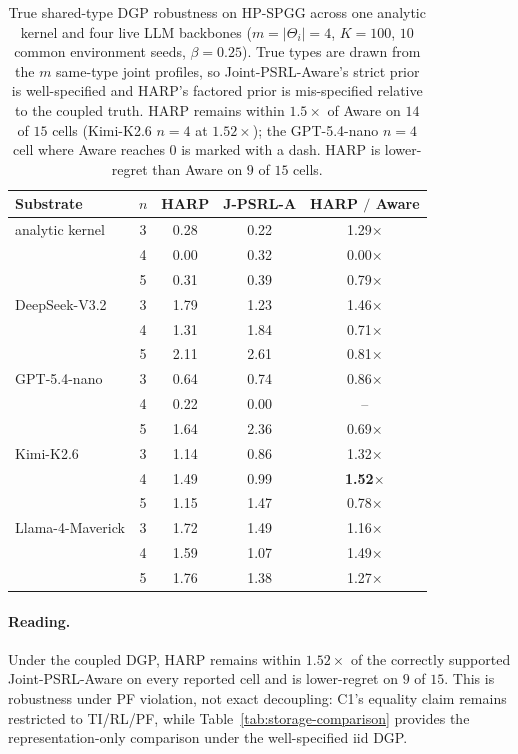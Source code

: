 \begin{table}[h]
\centering\small
\caption{True shared-type DGP robustness on HP-SPGG across one analytic kernel and four live LLM backbones ($m{=}|\Theta_i|{=}4$, $K{=}100$, $10$ common environment seeds, $\beta{=}0.25$). True types are drawn from the $m$ same-type joint profiles, so Joint-PSRL-Aware's strict prior is well-specified and HARP's factored prior is mis-specified relative to the coupled truth. HARP remains within $1.5\times$ of Aware on $14$ of $15$ cells (Kimi-K2.6 $n{=}4$ at $1.52\times$); the GPT-5.4-nano $n{=}4$ cell where Aware reaches $0$ is marked with a dash. HARP is lower-regret than Aware on $9$ of $15$ cells.}
\label{tab:true-shared-dgp}
\setlength{\tabcolsep}{8pt}
\begin{tabular}{@{}lcccc@{}}
\toprule
Substrate & $n$ & HARP & J-PSRL-A & HARP $/$ Aware \\
\midrule
analytic kernel       & 3 & 0.28 & 0.22 & 1.29$\times$ \\
                      & 4 & 0.00 & 0.32 & 0.00$\times$ \\
                      & 5 & 0.31 & 0.39 & 0.79$\times$ \\
\midrule
DeepSeek-V3.2         & 3 & 1.79 & 1.23 & 1.46$\times$ \\
                      & 4 & 1.31 & 1.84 & 0.71$\times$ \\
                      & 5 & 2.11 & 2.61 & 0.81$\times$ \\
\midrule
GPT-5.4-nano          & 3 & 0.64 & 0.74 & 0.86$\times$ \\
                      & 4 & 0.22 & 0.00 & --           \\
                      & 5 & 1.64 & 2.36 & 0.69$\times$ \\
\midrule
Kimi-K2.6             & 3 & 1.14 & 0.86 & 1.32$\times$ \\
                      & 4 & 1.49 & 0.99 & \textbf{1.52$\times$} \\
                      & 5 & 1.15 & 1.47 & 0.78$\times$ \\
\midrule
Llama-4-Maverick      & 3 & 1.72 & 1.49 & 1.16$\times$ \\
                      & 4 & 1.59 & 1.07 & 1.49$\times$ \\
                      & 5 & 1.76 & 1.38 & 1.27$\times$ \\
\bottomrule
\end{tabular}
\end{table}

\paragraph{Reading.} Under the coupled DGP, HARP remains within $1.52\times$ of the correctly supported Joint-PSRL-Aware on every reported cell and is lower-regret on $9$ of $15$. This is robustness under PF violation, not exact decoupling: C1's equality claim remains restricted to TI/RL/PF, while Table~\ref{tab:storage-comparison} provides the representation-only comparison under the well-specified iid DGP.


